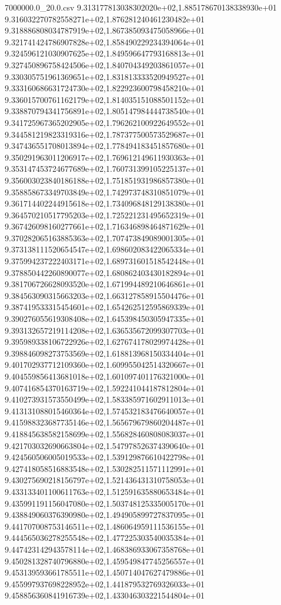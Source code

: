 \begin{filecontents*}{7000000.0_20.0.csv}
9.313177813038302020e+02,1.885178670138338930e+01
9.316032270782558271e+02,1.876281240461230482e+01
9.318886808034787919e+02,1.867385093475058966e+01
9.321741424786907828e+02,1.858490229234394064e+01
9.324596121030907625e+02,1.849596647793168813e+01
9.327450896758424506e+02,1.840704349203861057e+01
9.330305751961369651e+02,1.831813333520949527e+01
9.333160686631724730e+02,1.822923600798458210e+01
9.336015700761162179e+02,1.814035151088501152e+01
9.338870794341756891e+02,1.805147984444738540e+01
9.341725967365202905e+02,1.796262100922649552e+01
9.344581219823319316e+02,1.787377500573529687e+01
9.347436551708013894e+02,1.778494183451857680e+01
9.350291963011206917e+02,1.769612149611930363e+01
9.353147453724677689e+02,1.760731399105225137e+01
9.356003023840186188e+02,1.751851931986857380e+01
9.358858673349703849e+02,1.742973748310851079e+01
9.361714402244915618e+02,1.734096848129138380e+01
9.364570210517795203e+02,1.725221231495652319e+01
9.367426098160277661e+02,1.716346898464871629e+01
9.370282065163885363e+02,1.707473849089001305e+01
9.373138111520654547e+02,1.698602083422065334e+01
9.375994237222403171e+02,1.689731601518542448e+01
9.378850442260890077e+02,1.680862403430182894e+01
9.381706726628093520e+02,1.671994489210646861e+01
9.384563090315663203e+02,1.663127858915504476e+01
9.387419533315454601e+02,1.654262512595869339e+01
9.390276055619308408e+02,1.645398450305947335e+01
9.393132657219114208e+02,1.636535672099307703e+01
9.395989338106722926e+02,1.627674178029974428e+01
9.398846098273753569e+02,1.618813968150334404e+01
9.401702937712109360e+02,1.609955042514320667e+01
9.404559856413681018e+02,1.601097401176321000e+01
9.407416854370163719e+02,1.592241044187812804e+01
9.410273931573550499e+02,1.583385971602911013e+01
9.413131088015460364e+02,1.574532183476640057e+01
9.415988323687735146e+02,1.565679679860204487e+01
9.418845638582158699e+02,1.556828460808083037e+01
9.421703032690663804e+02,1.547978526374390640e+01
9.424560506005019533e+02,1.539129876610422798e+01
9.427418058516883548e+02,1.530282511571112991e+01
9.430275690218156797e+02,1.521436431310758053e+01
9.433133401100611763e+02,1.512591635880653484e+01
9.435991191156047080e+02,1.503748125335005170e+01
9.438849060376390980e+02,1.494905899727837095e+01
9.441707008753146511e+02,1.486064959111536155e+01
9.444565036278255548e+02,1.477225303540035384e+01
9.447423142943578114e+02,1.468386933067358768e+01
9.450281328740796880e+02,1.459549847745256557e+01
9.453139593661785511e+02,1.450714047627479886e+01
9.455997937698228952e+02,1.441879532769326033e+01
9.458856360841916739e+02,1.433046303221544804e+01

\end{filecontents*}
